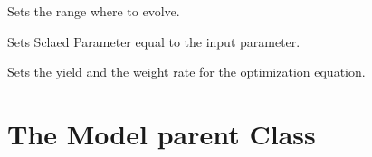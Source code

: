 \documentclass[letterpaper,10pt,english]{sphinxmanual}
\begin{document}
\begin{fulllineitems}
\begin{fulllineitems}
\end{fulllineitems}


\begin{fulllineitems}
\label{FittingClasses:Evolve.GenericOpt.setParamRanges}
Sets the range where to evolve.

\end{fulllineitems}


\begin{fulllineitems}
\label{FittingClasses:Evolve.GenericOpt.setScaledParameter}
Sets Sclaed Parameter equal to the input parameter.

\end{fulllineitems}


\begin{fulllineitems}
\label{FittingClasses:Evolve.GenericOpt.setWeights}
Sets the yield and the weight rate for the optimization equation.

\end{fulllineitems}


\end{fulllineitems}



\section{The Model parent Class}
\label{FittingClasses:the-model-parent-class}
\end{document}
